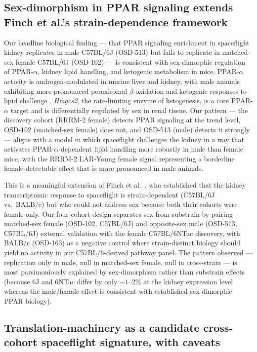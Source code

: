 \documentclass[11pt]{article}
\newcommand{\gene}[1]{\textit{#1}}
\begin{document}
\subsection{Sex-dimorphism in PPAR signaling extends Finch et al.'s strain-dependence framework}

Our headline biological finding --- that PPAR signaling enrichment in spaceflight kidney replicates in male C57BL/6J (OSD-513) but fails to replicate in matched-sex female C57BL/6J (OSD-102) --- is consistent with sex-dimorphic regulation of PPAR-$\alpha$, kidney lipid handling, and ketogenic metabolism in mice. PPAR-$\alpha$ activity is androgen-modulated in murine liver and kidney, with male animals exhibiting more pronounced peroxisomal $\beta$-oxidation and ketogenic responses to lipid challenge \citep{magee2018hepatocyte, jalouli2003sex}. \gene{Hmgcs2}, the rate-limiting enzyme of ketogenesis, is a core PPAR-$\alpha$ target and is differentially regulated by sex in renal tissue. Our pattern --- the discovery cohort (RRRM-2 female) detects PPAR signaling at the trend level, OSD-102 (matched-sex female) does not, and OSD-513 (male) detects it strongly --- aligns with a model in which spaceflight challenges the kidney in a way that activates PPAR-$\alpha$-dependent lipid handling more robustly in male than female mice, with the RRRM-2 LAR-Young female signal representing a borderline female-detectable effect that is more pronounced in male animals.

This is a meaningful extension of Finch et al.\ \citep{finch2025strain}, who established that the kidney transcriptomic response to spaceflight is strain-dependent (C57BL/6J vs.\ BALB/c) but who could not address sex because both their cohorts were female-only. Our four-cohort design separates sex from substrain by pairing matched-sex female (OSD-102, C57BL/6J) and opposite-sex male (OSD-513, C57BL/6J) external validation with the female C57BL/6NTac discovery, with BALB/c (OSD-163) as a negative control where strain-distinct biology should yield no activity in our C57BL/6-derived pathway panel. The pattern observed --- replication only in male, null in matched-sex female, null in cross-strain --- is most parsimoniously explained by sex-dimorphism rather than substrain effects (because 6J and 6NTac differ by only $\sim 1$--$2\%$ at the kidney expression level whereas the male/female effect is consistent with established sex-dimorphic PPAR biology).

\subsection{Translation-machinery as a candidate cross-cohort spaceflight signature, with caveats}
\end{document}
